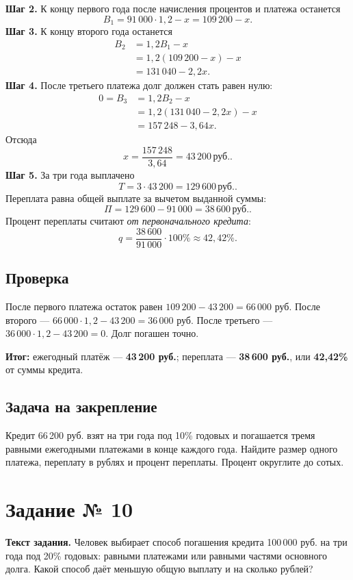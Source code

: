 \documentclass[12pt,a4paper]{article}
\newcommand{\rub}{\,\text{руб.}}
\newcommand{\Result}{\textcolor{teal!60!black}{\textbf{Итог:}}}
\begin{document}
\textbf{Шаг 2.} К концу первого года после начисления процентов и платежа останется
\[
B_1=91\,000\cdot1{,}2-x=109\,200-x.
\]
\textbf{Шаг 3.} К концу второго года останется
\[
\begin{aligned}
B_2&=1{,}2B_1-x\\
&=1{,}2(109\,200-x)-x\\
&=131\,040-2{,}2x.
\end{aligned}
\]
\textbf{Шаг 4.} После третьего платежа долг должен стать равен нулю:
\[
\begin{aligned}
0=B_3&=1{,}2B_2-x\\
&=1{,}2(131\,040-2{,}2x)-x\\
&=157\,248-3{,}64x.
\end{aligned}
\]
Отсюда
\[
x=\frac{157\,248}{3{,}64}=43\,200\rub.
\]
\textbf{Шаг 5.} За три года выплачено
\[
T=3\cdot43\,200=129\,600\rub.
\]
Переплата равна общей выплате за вычетом выданной суммы:
\[
\Pi=129\,600-91\,000=38\,600\rub.
\]
Процент переплаты считают \emph{от первоначального кредита}:
\[
q=\frac{38\,600}{91\,000}\cdot100\%
\approx42{,}42\%.
\]

\subsection*{Проверка}
После первого платежа остаток равен $109\,200-43\,200=66\,000$ руб. После второго --- $66\,000\cdot1{,}2-43\,200=36\,000$ руб. После третьего --- $36\,000\cdot1{,}2-43\,200=0$. Долг погашен точно.

\Result{} ежегодный платёж --- \textbf{43\,200 руб.}; переплата --- \textbf{38\,600 руб.}, или \textbf{42,42\%} от суммы кредита.

\subsection*{Задача на закрепление}
Кредит 66\,200 руб. взят на три года под 10\% годовых и погашается тремя равными ежегодными платежами в конце каждого года. Найдите размер одного платежа, переплату в рублях и процент переплаты. Процент округлите до сотых.

\newpage
{}\label{task:10}
\section*{Задание № 10}
\textbf{Текст задания.} Человек выбирает способ погашения кредита 100\,000 руб. на три года под 20\% годовых: равными платежами или равными частями основного долга. Какой способ даёт меньшую общую выплату и на сколько рублей?
\end{document}
